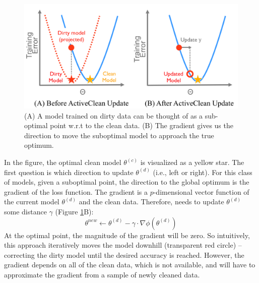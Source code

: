 \begin{figure}[ht!]
\centering
 \includegraphics[width=\columnwidth]{figs/update-arch2.png}\vspace{-1em}
 \caption{(A) A model trained on dirty data can be thought of as a sub-optimal point w.r.t to the clean data. (B) The gradient gives us the direction to move the suboptimal model to approach the true optimum. \label{update-arch2}}\vspace{-1em}
\end{figure}

In the figure, the optimal clean model $\theta^{(c)}$ is visualized as a yellow star.
The first question is which direction to update $\theta^{(d)}$ (i.e., left or right).
For this class of models, given a suboptimal point, the direction to 
the global optimum is the gradient of the loss function.
The gradient is a $p$-dimensional vector function of the current model $\theta^{(d)}$ and the clean data.
Therefore, \sys needs to update $\theta^{(d)}$ some distance $\gamma$ (Figure \ref{update-arch2}B):
\[
\theta^{new} \leftarrow \theta^{(d)} - \gamma \cdot \nabla\phi(\theta^{(d)})
\]
At the optimal point, the magnitude of the gradient will be zero.
So intuitively, this approach iteratively moves the model downhill (transparent red circle) -- correcting the dirty model until the desired accuracy is reached.
However, the gradient depends on all of the clean data, which is not available, and \sys will have to approximate the gradient from a sample of newly cleaned data.

